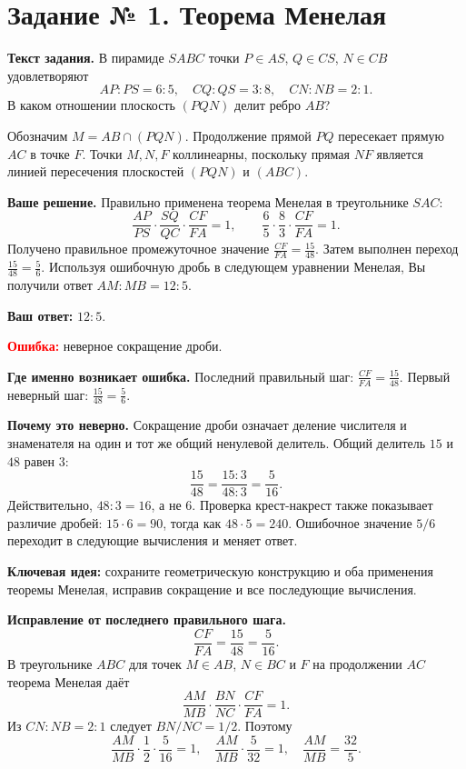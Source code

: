\documentclass[a4paper,12pt]{article}
\begin{document}
\section*{Задание № 1. Теорема Менелая}
\textbf{Текст задания.}
В пирамиде $SABC$ точки $P\in AS$, $Q\in CS$, $N\in CB$ удовлетворяют
\[
AP:PS=6:5,\quad CQ:QS=3:8,\quad CN:NB=2:1.
\]
В каком отношении плоскость $(PQN)$ делит ребро $AB$?

Обозначим $M=AB\cap(PQN)$. Продолжение прямой $PQ$ пересекает
прямую $AC$ в точке $F$. Точки $M,N,F$ коллинеарны,
поскольку прямая $NF$ является линией пересечения плоскостей $(PQN)$ и $(ABC)$.

\textbf{Ваше решение.}
Правильно применена теорема Менелая в треугольнике $SAC$:
\[
\frac{AP}{PS}\cdot\frac{SQ}{QC}\cdot\frac{CF}{FA}=1,\qquad
\frac65\cdot\frac83\cdot\frac{CF}{FA}=1.
\]
Получено правильное промежуточное значение $\frac{CF}{FA}=\frac{15}{48}$.
Затем выполнен переход $\frac{15}{48}=\frac56$.
Используя ошибочную дробь в следующем уравнении Менелая,
Вы получили ответ $AM:MB=12:5$.

\textbf{Ваш ответ:} $12:5$.

\textcolor{red}{\textbf{Ошибка:}} неверное сокращение дроби.

\textbf{Где именно возникает ошибка.}
Последний правильный шаг: $\displaystyle\frac{CF}{FA}=\frac{15}{48}$.
Первый неверный шаг: $\displaystyle\frac{15}{48}=\frac56$.

\textbf{Почему это неверно.}
Сокращение дроби означает деление числителя и знаменателя
на один и тот же общий ненулевой делитель. Общий делитель $15$ и $48$ равен $3$:
\[
\frac{15}{48}=\frac{15:3}{48:3}=\frac5{16}.
\]
Действительно, $48:3=16$, а не $6$. Проверка крест-накрест
также показывает различие дробей: $15\cdot6=90$,
тогда как $48\cdot5=240$.
Ошибочное значение $5/6$ переходит в следующие вычисления и меняет ответ.

\textcolor{blue!60!black}{\textbf{Ключевая идея:}}
сохраните геометрическую конструкцию и оба применения теоремы Менелая,
исправив сокращение и все последующие вычисления.

\textbf{Исправление от последнего правильного шага.}
\[
\frac{CF}{FA}=\frac{15}{48}=\frac5{16}.
\]
В треугольнике $ABC$ для точек $M\in AB$, $N\in BC$ и
$F$ на продолжении $AC$ теорема Менелая даёт
\[
\frac{AM}{MB}\cdot\frac{BN}{NC}\cdot\frac{CF}{FA}=1.
\]
Из $CN:NB=2:1$ следует $BN/NC=1/2$. Поэтому
\[
\frac{AM}{MB}\cdot\frac12\cdot\frac5{16}=1,\quad
\frac{AM}{MB}\cdot\frac5{32}=1,\quad
\boxed{\frac{AM}{MB}=\frac{32}{5}}.
\]
\end{document}
